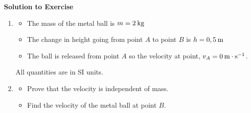 {\begin{mdframed}[linewidth=4, leftmargin=40, rightmargin=40]
\begin{exercise}
\begin{figure}[H]
\begin{center}
      \vspace{2pt}
    \vspace{.1in}
    
    \end{center}

 \end{figure}   

    \addtocounter{footnote}{-0}
    
        \par 
        
        \vspace{5pt}
        \label{m38786*solfhsst!!!underscore!!!id2149}\noindent\textbf{Solution to Exercise } \label{m38786*listfhsst!!!underscore!!!id2149}\begin{enumerate}[noitemsep, label=\textbf{Step} \textbf{\arabic*}. ] 
            \leftskip=20pt\rightskip=\leftskip\item  
        \label{m38786*id69799}\begin{itemize}[noitemsep]
            \leftskip=20pt\rightskip=\leftskip\label{m38786*uid90}\item The mass of the metal ball is \begin{math}m=2\phantom{\rule{2pt}{0ex}}\mathrm{kg}\end{math}
\label{m38786*uid91}\item The change in height going from point \begin{math}A\end{math} to point \begin{math}B\end{math} is \begin{math}h=0,5\phantom{\rule{2pt}{0ex}}\mathrm{m}\end{math}
\label{m38786*uid92}\item The ball is released from point \begin{math}A\end{math} so the velocity at point, \begin{math}{v}_{A}=0\phantom{\rule{2pt}{0ex}}\mathrm{m}\ensuremath{\cdot}\mathrm{s}{}^{-1}\end{math}.
\end{itemize}
        
        \label{m38786*id69924}All quantities are in SI units.\par 
        \item  
        \label{m38786*id69934}\begin{itemize}[noitemsep]
            \leftskip=20pt\rightskip=\leftskip\label{m38786*uid93}\item Prove that the velocity is independent of mass.
\label{m38786*uid94}\item Find the velocity of the metal ball at point \begin{math}B\end{math}.
\end{itemize}
        

\end{enumerate}
\end{exercise}
\end{mdframed}}
